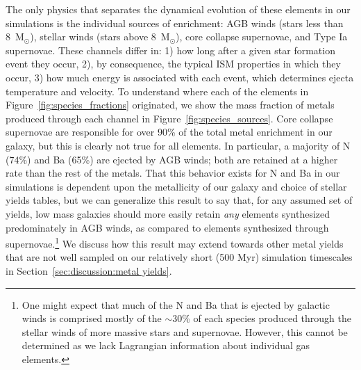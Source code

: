 \documentclass[twocolumn]{aastex61}
\begin{document}
The only physics that separates the dynamical evolution of these elements in our simulations is the individual sources of enrichment: AGB winds (stars less than 8~M$_{\odot}$), stellar winds (stars above 8~M$_{\odot}$), core collapse supernovae, and Type Ia supernovae. These channels differ in: 1) how long after a given star formation event they occur, 2), by consequence, the typical ISM properties in which they occur, 3) how much energy is associated with each event, which determines ejecta temperature and velocity. To understand where each of the elements in Figure~\ref{fig:species_fractions} originated, we show the mass fraction of metals produced through each channel in Figure~\ref{fig:species_sources}. Core collapse supernovae are responsible for over 90\% of the total metal enrichment in our galaxy, but this is clearly not true for all elements. In particular, a majority of N (74\%) and Ba (65\%) are ejected by AGB winds; both are retained at a higher rate than the rest of the metals. That this behavior exists for N and Ba in our simulations is dependent upon the metallicity of our galaxy and choice of stellar yields tables, but we can generalize this result to say that, for any assumed set of yields, low mass galaxies should more easily retain \textit{any} elements synthesized predominately in AGB winds, as compared to elements synthesized through supernovae.\footnote{One might expect that much of the N and Ba that is ejected by galactic winds is comprised mostly of the $\sim$30\% of each species produced through the stellar winds of more massive stars and supernovae. However, this cannot be determined as we lack Lagrangian information about individual gas elements.}
 We discuss how this result may extend towards other metal yields that are not well sampled on our relatively short (500 Myr) simulation timescales in Section~\ref{sec:discussion:metal yields}.
\end{document}
